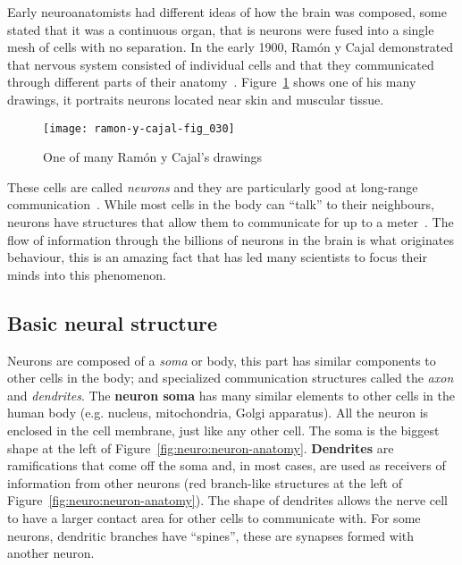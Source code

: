 Early neuroanatomists had different ideas of how the brain was composed, some stated that it was a continuous organ, that is neurons were fused into a single mesh of cells with no separation. In the early 1900, Ramón y Cajal demonstrated that nervous system consisted of individual cells and that they communicated through different parts of their anatomy~\cite{Nemri:2010}. Figure~\ref{fig:neuro:ramon-y-cajal-neuro} shows one of his many drawings, it portraits neurons located near skin and muscular tissue.

\begin{figure}[hbt]
  \begin{center}
    \texttt{[image: ramon-y-cajal-fig\_030]}
    \caption{One of many Ramón y Cajal's drawings~\cite{cervantes-images}}
    \label{fig:neuro:ramon-y-cajal-neuro}
  \end{center}
\end{figure}

These cells are called \emph{neurons} and they are particularly good at  long-range communication~\cite{thompson2000brain}. While most cells in the body can ``talk'' to their neighbours, neurons have structures that allow them to communicate for up to a meter~\cite{eye-brain-vision-hubel1995}. The flow of information through the billions of neurons in the brain is what originates behaviour, this is an amazing fact that has led many scientists to focus their minds into this phenomenon.

\subsection{Basic neural structure}

Neurons are composed of a \emph{soma} or body, this part has similar components to other cells in the body; and specialized communication structures called the \emph{axon} and \emph{dendrites}. The \textbf{neuron soma} has many similar elements to other cells in the human body (e.g. nucleus, mitochondria, Golgi apparatus). All the neuron is enclosed in the cell membrane, just like any other cell. The soma is the biggest shape at the left of Figure~\ref{fig:neuro:neuron-anatomy}. \textbf{Dendrites} are ramifications that come off the soma and, in most cases, are used as receivers of information from other neurons (red branch-like structures at the left of Figure~\ref{fig:neuro:neuron-anatomy}). The shape of dendrites allows the nerve cell to have a larger contact area for other cells to communicate with. For some neurons, dendritic branches have ``spines'', these are synapses formed with another neuron.


